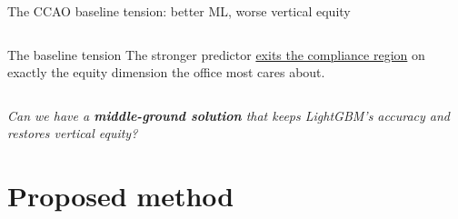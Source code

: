 \documentclass[aspectratio=169,12pt,]{beamer}
\newcommand{\1}{\mathbf{1}}
\begin{document}
\begin{frame}{The CCAO baseline tension: better ML, worse vertical equity}
\begin{columns}[T,onlytextwidth]
\begin{block}{ The baseline tension}
The stronger predictor \underline{exits the compliance region} on exactly the equity dimension the office most cares about.
\end{block}
\end{columns}

\vspace{1mm}
\begin{center}\itshape
Can we have a \textbf{middle-ground solution} that keeps LightGBM's accuracy and restores vertical equity?
\end{center}

\end{frame}


\section{Proposed method}
\end{document}
